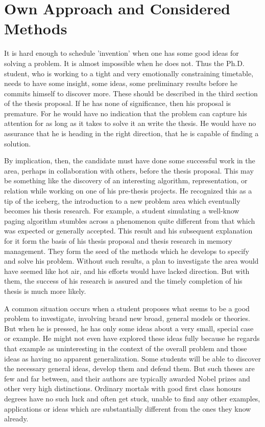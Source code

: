 \section{Own Approach and Considered Methods}\label{sec:ideas}

It is hard enough to schedule 'invention' when one has some good ideas for solving a problem. It is almost impossible when he does not. Thus the Ph.D. student, who is working to a tight and very emotionally constraining timetable, needs to have some insight, some ideas, some preliminary results before he commits himself to discover more. These should be described in the third section of the thesis proposal. If he has none of significance, then his proposal is premature. For he would have no indication that the problem can capture his attention for as long as it takes to solve it an write the thesis. He would have no assurance that he is heading in the right direction, that he is capable of finding a solution.

By implication, then, the candidate must have done some successful work in the area, perhaps in collaboration with others, before the thesis proposal. This may be something like the discovery of an interesting algorithm, representation, or relation while working on one of his pre-thesis projects. He recognized this as a tip of the iceberg, the introduction to a new problem area which eventually becomes his thesis research. For example, a student simulating a well-know paging algorithm stumbles across a phenomenon quite different from that which was expected or generally accepted. This result and his subsequent explanation for it form the basis of his thesis proposal and thesis research in memory management. They form the seed of the methods which he develops to specify and solve his problem. Without such results, a plan to investigate the area would have seemed like hot air, and his efforts would have lacked direction. But with them, the success of his research is assured and the timely completion of his thesis is much more likely.

A common situation occurs when a student proposes what seems to be a good problem to investigate, involving brand new broad, general models or theories. But when he is pressed, he has only some ideas about a very small, special case or example. He might not even have explored these ideas fully because he regards that example as uninteresting in the context of the overall problem and those ideas as having no apparent generalization. Some students will be able to discover the necessary general ideas, develop them and defend them. But such theses are few and far between, and their authors are typically awarded Nobel prizes and other very high distinctions. Ordinary mortals with good first class honours degrees have no such luck and often get stuck, unable to find any other examples, applications or ideas which are substantially different from the ones they know already.

